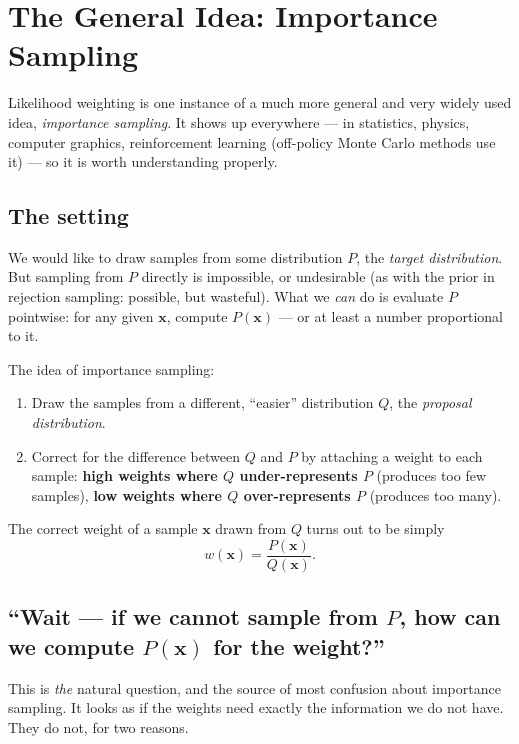 \documentclass[11pt, oneside]{book}
\newcommand{\bx}{\mathbf{x}}  \newcommand{\by}{\mathbf{y}}
\let\originalsection\section
\renewcommand{\section}{\Needspace{7\baselineskip}\originalsection}
\let\originalsubsection\subsection
\renewcommand{\subsection}{\Needspace{6\baselineskip}\originalsubsection}
\begin{document}
\section{The General Idea: Importance Sampling}
\label{sec:importance-sampling}

Likelihood weighting is one instance of a much more general and very widely
used idea, \emph{importance sampling}. It shows up everywhere --- in
statistics, physics, computer graphics, reinforcement learning (off-policy Monte Carlo
methods use it) --- so it is worth understanding properly.

\subsection{The setting}

We would like to draw samples from some distribution $P$, the \emph{target
distribution}. But sampling from $P$ directly is impossible, or undesirable
(as with the prior in rejection sampling: possible, but wasteful). What we
\emph{can} do is evaluate $P$ pointwise: for any given $\bx$, compute $P(\bx)$
--- or at least a number proportional to it.

The idea of importance sampling:
\begin{enumerate}
  \item Draw the samples from a different, ``easier'' distribution $Q$, the
    \emph{proposal distribution}.
  \item Correct for the difference between $Q$ and $P$ by attaching a weight
    to each sample: \textbf{high weights where $Q$ under-represents $P$}
    (produces too few samples), \textbf{low weights where $Q$ over-represents
    $P$} (produces too many).
\end{enumerate}
The correct weight of a sample $\bx$ drawn from $Q$ turns out to be simply
\[
w(\bx) = \frac{P(\bx)}{Q(\bx)} .
\]

\subsection{``Wait --- if we cannot sample from \texorpdfstring{$P$}{P}, how can we compute \texorpdfstring{$P(\bx)$}{P(x)} for the weight?''}
\label{sec:is-confusion}

This is \emph{the} natural question, and the source of most confusion about
importance sampling. It looks as if the weights need exactly the information
we do not have. They do not, for two reasons.
\end{document}
